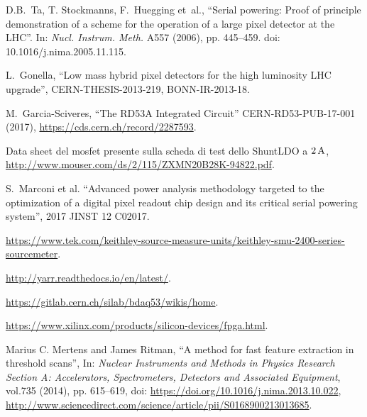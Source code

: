 \begin{thebibliography}{1}
 D.B.~Ta, T. Stockmanns, F.~Huegging et~al., ``Serial powering: Proof of principle demonstration of a scheme for the operation of a large pixel detector at the LHC''. In: \textit{Nucl. Instrum. Meth.} A557 (2006), pp. 445--459. doi: 10.1016/j.nima.2005.11.115.

 L.~Gonella, ``Low mass hybrid pixel detectors for the high luminosity LHC upgrade'', CERN-THESIS-2013-219, BONN-IR-2013-18.

 M.~Garcia-Sciveres, ``The RD53A Integrated Circuit''
  CERN-RD53-PUB-17-001 (2017), \url{https://cds.cern.ch/record/2287593}.

 Data sheet del mosfet presente sulla scheda di test dello ShuntLDO a $2\rm \, A$,  
  \url{http://www.mouser.com/ds/2/115/ZXMN20B28K-94822.pdf}.

 S.~Marconi et al. ``Advanced power analysis methodology targeted to the optimization of a digital pixel readout chip design and its critical serial powering system'', 2017 JINST 12 C02017.

 \url{https://www.tek.com/keithley-source-measure-units/keithley-smu-2400-series-sourcemeter}.

 \url{http://yarr.readthedocs.io/en/latest/}.

 \url{https://gitlab.cern.ch/silab/bdaq53/wikis/home}.

 \url{https://www.xilinx.com/products/silicon-devices/fpga.html}.

 Marius C. Mertens and James Ritman, ``A method for fast feature extraction in threshold scans'', 
In: \textit{Nuclear Instruments and Methods in Physics Research Section A: Accelerators, Spectrometers, Detectors and Associated Equipment}, 
vol.735 (2014), pp. 615--619, doi: \url{https://doi.org/10.1016/j.nima.2013.10.022}, 
	\url{http://www.sciencedirect.com/science/article/pii/S0168900213013685}.

\end{thebibliography}